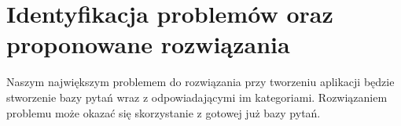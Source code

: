 	\newpage
\section{Identyfikacja problemów oraz proponowane rozwiązania}		%
Naszym największym problemem do rozwiązania przy tworzeniu aplikacji będzie stworzenie bazy pytań wraz z odpowiadającymi im kategoriami.
Rozwiązaniem problemu może okazać się skorzystanie z gotowej już bazy pytań. 